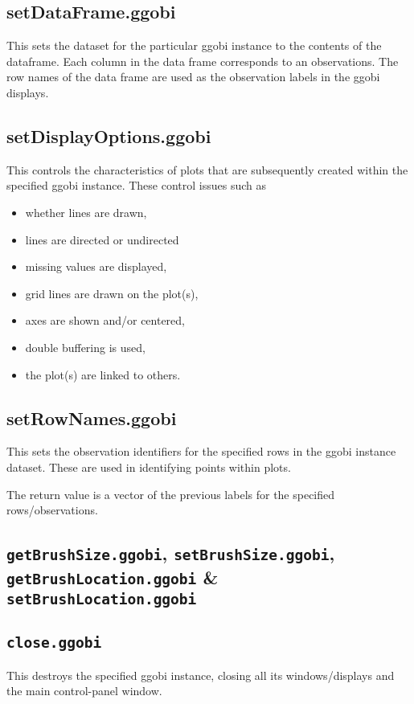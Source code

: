 \documentclass{article}
\def\SFunction#1{{\texttt{\red #1}}}
\begin{document}
\subsection{setDataFrame.ggobi}
This sets the dataset for the particular ggobi instance to the
contents of the dataframe.  Each column in the data frame corresponds
to an observations. The row names of the data frame are used as the
observation labels in the ggobi displays.

\subsection{setDisplayOptions.ggobi}
This controls the characteristics
of plots that are subsequently
created within the specified ggobi instance.
These control issues such as 
\begin{itemize}
\item whether lines are drawn, 
\item lines are directed or undirected
\item missing values are displayed,
\item grid lines are drawn on the plot(s),
\item axes are shown and/or centered,
\item double buffering is used,
\item the plot(s) are linked to others.
\end{itemize}



\subsection{setRowNames.ggobi}
This sets the observation identifiers for the 
specified rows in the ggobi instance dataset.
These are used in identifying points within 
plots.

The return value is a vector of the previous labels for the
specified rows/observations.





\subsection{\SFunction{getBrushSize.ggobi},
\SFunction{setBrushSize.ggobi},
\SFunction{getBrushLocation.ggobi} \&
\SFunction{setBrushLocation.ggobi}}


\subsection{\SFunction{close.ggobi}}
This destroys the specified ggobi instance, closing all its
windows/displays and the main control-panel window.
\end{document}
